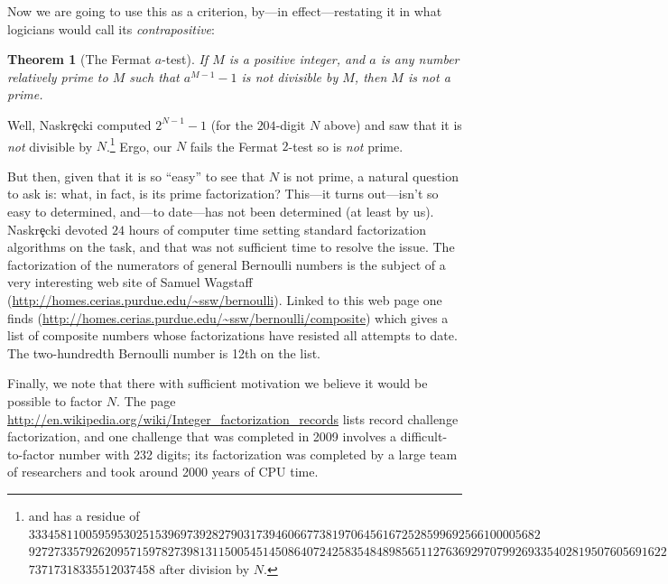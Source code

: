 \documentclass[openany]{book}
\theoremstyle{plain}
\newtheorem{theorem}{Theorem}[chapter]
\theoremstyle{definition}
\begin{document}
{ Now we are going to use this as a criterion, by---in effect---restating it in what logicians would call  its {\it contrapositive}:
 \begin{theorem}[The Fermat $a$-test] 
If $M$ is a positive integer, and $a$ is any number relatively prime to $M$ such that  $a^{M-1} - 1$ is {\it not} divisible by $M$, then $M$ is {\it not} a prime. 
\end{theorem}

Well, Naskr\c{e}cki computed $2^{N-1}-1$  (for the $204$-digit $N$ above)   and saw that 
it is {\it not} divisible by $N$.{\footnote{and has a residue of $3334581100595953025153969739282790317394606677381970645616725285996925
66100005682$\newline$92727335792620957159782739813115005451450864072425835484898
5651127636929707992693354028195076056916221$\newline$73717318335512037458$ after division by $N$.}}  
Ergo, our $N$ fails the  Fermat $2$-test so is {\it not} prime. 

But then, given that it is so ``easy'' to see that $N$ is not prime, a
natural question to ask is: what, in fact, is its prime factorization?
This---it turns out---isn't so easy to determined, and---to
date---has not been determined (at least by us).
Naskr\c{e}cki devoted $24$ hours of computer time setting standard factorization
algorithms on the task, and that was not sufficient time to resolve
the issue.  The factorization of the numerators of general Bernoulli
numbers is the subject of a very interesting web site of Samuel
Wagstaff (\url{http://homes.cerias.purdue.edu/~ssw/bernoulli}).
Linked to this web page one finds
(\url{http://homes.cerias.purdue.edu/~ssw/bernoulli/composite}) which gives
a list of composite numbers whose factorizations have resisted all
attempts to date.  The two-hundredth Bernoulli number is 12th on the list.

Finally, we note that there with sufficient motivation we believe it
would be possible to factor $N$.  The page
\url{http://en.wikipedia.org/wiki/Integer_factorization_records} lists
record challenge factorization, and one challenge that was completed
in 2009 involves a difficult-to-factor number with 232 digits; its
factorization was completed by a large team of researchers and took around
2000 years of CPU time.}
\end{document}
